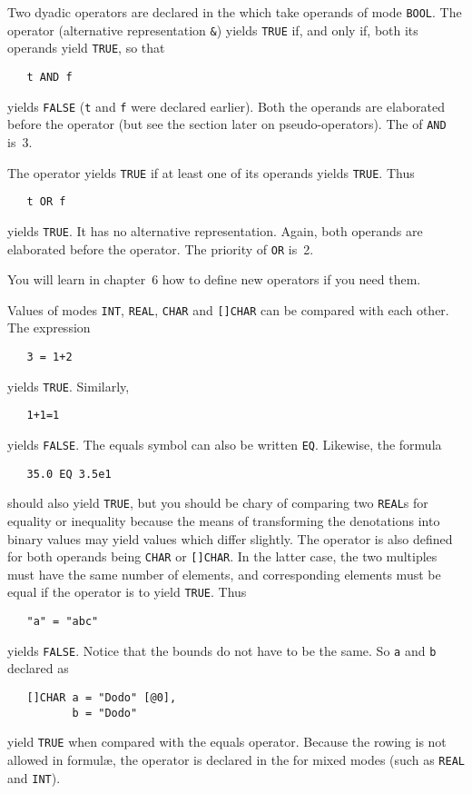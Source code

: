 Two dyadic operators are declared in the  which
take operands of mode \verb|BOOL|. The operator 
(alternative representation \verb|&|) yields \verb|TRUE| if,
and only if, both its operands yield \verb|TRUE|, so that
\begin{verbatim}
   t AND f
\end{verbatim}
\noindent
yields \verb|FALSE| (\verb|t| and \verb|f| were declared earlier).
Both the operands are elaborated before the operator (but see the
section later on pseudo-operators).  The  of \verb|AND|
is~3.

The operator  yields \verb|TRUE| if at least one of its
operands yields \verb|TRUE|. Thus
\begin{verbatim}
   t OR f
\end{verbatim}
\noindent
yields \verb|TRUE|. It has no alternative representation. Again, both
operands are elaborated before the operator. The priority of
\verb|OR| is~2.

You will learn in chapter~6 how to define new operators if you need
them.

Values of modes \verb|INT|, \verb|REAL|, \verb|CHAR| and
\verb|[]CHAR| can be compared with each other.  The expression
\begin{verbatim}
   3 = 1+2
\end{verbatim}
\noindent
yields \verb|TRUE|.  Similarly,
\begin{verbatim}
   1+1=1
\end{verbatim}
\noindent
yields \verb|FALSE|.  The equals symbol \ixtt{=} can also be written
\verb|EQ|. Likewise, the formula
\begin{verbatim}
   35.0 EQ 3.5e1
\end{verbatim}
\noindent
should also yield \verb|TRUE|, but you should be chary of comparing
two \verb|REAL|s for equality or inequality because the means of
transforming the denotations into binary values may yield values
which differ slightly.  The operator is also defined for both
operands being \verb|CHAR| or \verb|[]CHAR|.  In the latter case, the
two multiples must have the same number of elements, and
corresponding elements must be equal if the operator is to yield
\verb|TRUE|.  Thus
\begin{verbatim}
   "a" = "abc"
\end{verbatim}
\noindent
yields \verb|FALSE|. Notice that the bounds do not have to be the
same.  So \verb|a| and \verb|b| declared as
\begin{verbatim}
   []CHAR a = "Dodo" [@0],
          b = "Dodo"
\end{verbatim}
\noindent
yield \verb|TRUE| when compared with the equals operator.  Because
the rowing  is not allowed in
formul{\ae}, the operator is declared in the 
for mixed modes (such as \verb|REAL| and \verb|INT|).

